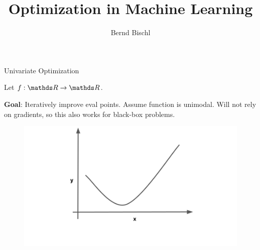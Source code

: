 \documentclass[11pt,compress,t,notes=noshow, xcolor=table]{beamer}
\title{Optimization in Machine Learning}
\author{Bernd Bischl}
\date{}
\begin{document}
\sloppy

\begin{vbframe}{Univariate Optimization}

Let $f: \R \to \R$. 

\lz 

\textbf{Goal}: Iteratively improve eval points. Assume function is unimodal. Will not rely on gradients, so this also works for black-box problems.

\vspace*{-0.2cm} 

\begin{figure}
  \includegraphics{figure_man/golden-ratio-0.png}
\end{figure}

\end{vbframe}
\end{document}
